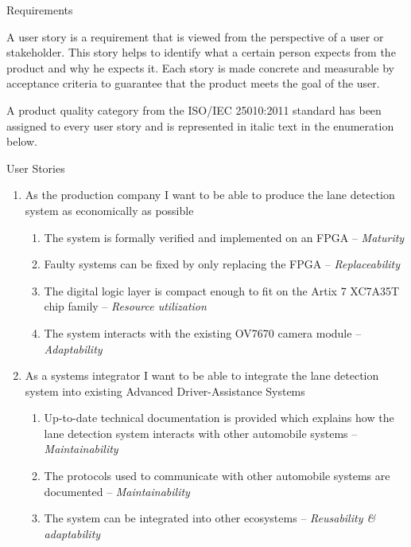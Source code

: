 \documentclass{matthijs}
\begin{document}
	\begin{hoofdstuk}{Requirements}

		A user story is a requirement that is viewed from the perspective of a user or stakeholder.
		This story helps to identify what a certain person expects from the product and why he expects it.
		Each story is made concrete and measurable by acceptance criteria to guarantee that the product meets the goal of the user.

		\bigskip

		A product quality category from the ISO/IEC 25010:2011 standard \cite{iso25010systems} has been assigned to every user story and is represented in italic text in the enumeration below.

		\vspace{1ex}

		\begin{figuur}{User Stories}

			\begin{enumerate}[labelsep=2ex, font=\bfseries]
				
				\item	As the production company I want to be able to produce the lane detection system as economically as possible

					\begin{enumerate}[leftmargin=8ex]

						\item	The system is formally verified and implemented on an FPGA -- \textit{Maturity}
						\item	Faulty systems can be fixed by only replacing the FPGA -- \textit{Replaceability}
						\item	The digital logic layer is compact enough to fit on the Artix 7 XC7A35T chip family -- \textit{Resource utilization}
						\item	The system interacts with the existing OV7670 camera module -- \textit{Adaptability}

					\end{enumerate}

				\item	As a systems integrator I want to be able to integrate the lane detection system into existing Advanced Driver-Assistance Systems

					\begin{enumerate}[leftmargin=8ex]

						\item	Up-to-date technical documentation is provided which explains how the lane detection system interacts with other automobile systems -- \textit{Maintainability}
						\item	The protocols used to communicate with other automobile systems are documented -- \textit{Maintainability}
						\item	The system can be integrated into other ecosystems -- \textit{Reusability \& adaptability}


\end{enumerate}
\end{enumerate}
\end{figuur}
\end{hoofdstuk}
\end{document}
